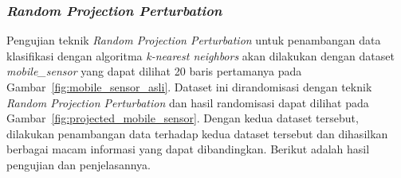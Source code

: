 \subsubsection{\textit{Random Projection Perturbation}}
\label{sec:pengujian-klasifikasi-rpp}

Pengujian teknik \textit{Random Projection Perturbation} untuk penambangan data klasifikasi dengan algoritma \textit{k-nearest neighbors} akan dilakukan dengan dataset \textit{mobile\_sensor} yang dapat dilihat 20 baris pertamanya pada Gambar~\ref{fig:mobile_sensor_asli}. Dataset ini dirandomisasi dengan teknik \textit{Random Projection Perturbation} dan hasil randomisasi dapat dilihat pada Gambar~\ref{fig:projected_mobile_sensor}. Dengan kedua dataset tersebut, dilakukan penambangan data terhadap kedua dataset tersebut dan dihasilkan berbagai macam informasi yang dapat dibandingkan. Berikut adalah hasil pengujian dan penjelasannya.

